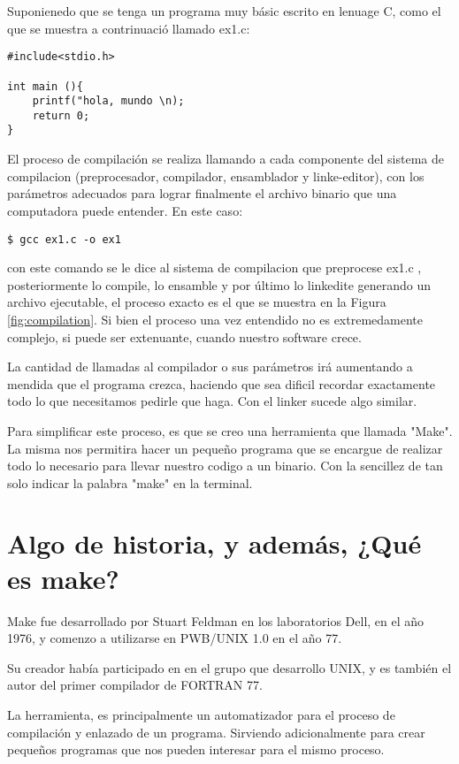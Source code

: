 \documentclass[]{article}
\begin{document}
	Suponienedo que se tenga un programa muy básic escrito en lenuage C, como el que se muestra a contrinuació llamado ex1.c:
\begin{lstlisting}
#include<stdio.h>

int main (){
    printf("hola, mundo \n);
    return 0;
}
\end{lstlisting}
	
El proceso de compilación se realiza llamando a cada componente del sistema de compilacion (preprocesador, compilador, ensamblador y linke-editor), con los par\'{a}metros adecuados para lograr finalmente el archivo binario que una computadora puede entender. En este caso:
\begin{lstlisting}
$ gcc ex1.c -o ex1  
\end{lstlisting}

con este comando se le dice al sistema de compilacion que preprocese ex1.c , posteriormente lo compile, lo ensamble y por último lo linkedite generando un archivo ejecutable, el proceso exacto es el que se muestra en la Figura \ref{fig:compilation}. Si bien el proceso una vez entendido no es extremedamente complejo, si puede ser extenuante, cuando nuestro software crece.

La cantidad de llamadas al compilador o sus parámetros irá aumentando a mendida que el programa crezca, haciendo que sea dificil recordar exactamente todo lo que necesitamos pedirle que haga. Con el linker sucede algo similar.
	
	Para simplificar este proceso, es que se creo una herramienta que llamada "Make". La misma nos permitira hacer un peque\~{n}o programa que se encargue de realizar todo lo necesario para llevar nuestro codigo a un binario. Con la sencillez de tan solo indicar la palabra "make" en la terminal.
	
\section{Algo de historia, y además, ¿Qué es make?  }
	
	Make fue desarrollado por Stuart Feldman en los laboratorios Dell, en el año 1976, y comenzo a utilizarse en PWB/UNIX 1.0 en el año 77.
	
	Su creador había participado en en el grupo que desarrollo UNIX, y es tambi\'{e}n el autor del primer compilador de FORTRAN 77.
	
	La herramienta, es principalmente un automatizador para el proceso de compilaci\'{o}n y enlazado de un programa. Sirviendo adicionalmente para crear pequeños programas que nos pueden interesar para el mismo proceso.
\end{document}
